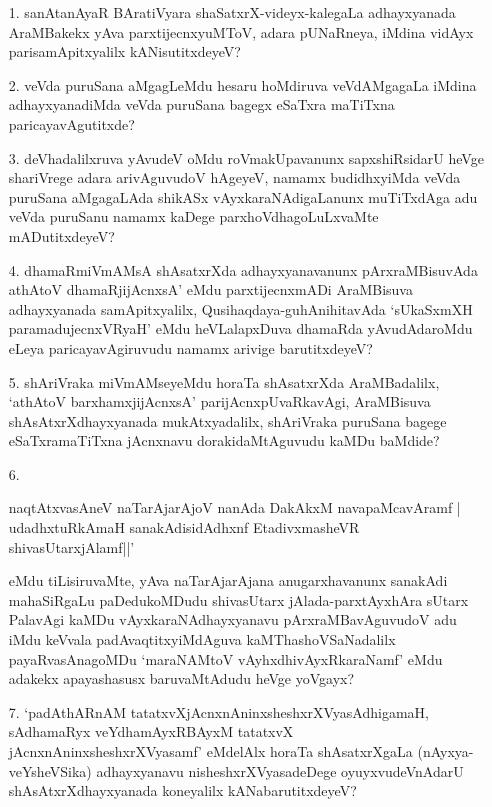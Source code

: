 \begin{itemize}
\item[1.] sanAtanAyaR BAratiVyara shaSatxrX-videyx-kalegaLa adhayxyanada AraMBakekx yAva parxtijecnxyuMToV, adara pUNaRneya, iMdina vidAyx parisamApitxyalilx kANisutitxdeyeV?

\item[2.] veVda puruSana aMgagLeMdu hesaru hoMdiruva veVdAMgagaLa iMdina adhayxyanadiMda veVda puruSana bagegx eSaTxra maTiTxna paricayavAgutitxde?

\item[3.] deVhadalilxruva yAvudeV oMdu roVmakUpavanunx sapxshiRsidarU heVge shariVrege adara arivAguvudoV hAgeyeV, namamx budidhxyiMda veVda puruSana aMgagaLAda shikASx vAyxkaraNAdigaLanunx muTiTxdAga adu veVda puruSanu namamx kaDege parxhoVdhagoLuLxvaMte mADutitxdeyeV?

\item[4.] dhamaRmiVmAMsA shAsatxrXda adhayxyanavanunx pArxraMBisuvAda 	athAtoV dhamaRjijAcnxsA'\label{40} eMdu parxtijecnxmADi AraMBisuva adhayxyanada samApitxyalilx, Qusihaqdaya-guhAnihitavAda `sUkaSxmXH paramadujecnxVRyaH'\label{40} eMdu heVLalapxDuva dhamaRda yAvudAdaroMdu eLeya paricayavAgiruvudu namamx arivige barutitxdeyeV?

\item[5.] shAriVraka miVmAMseyeMdu horaTa shAsatxrXda AraMBadalilx, `athAtoV barxhamxjijAcnxsA'\label{40} parijAcnxpUvaRkavAgi, AraMBisuva shAsAtxrXdhayxyanada mukAtxyadalilx, shAriVraka puruSana bagege eSaTxramaTiTxna jAcnxnavu dorakidaMtAguvudu kaMDu baMdide?

\item[6.]
\begin{shloka}
naqtAtxvasAneV naTarAjarAjoV nanAda DakAkxM navapaMcavAramf |\\\label{40}
udadhxtuRkAmaH sanakAdisidAdhxnf EtadivxmasheVR shivasUtarxjAlamf||'
\end{shloka}

eMdu tiLisiruvaMte, yAva naTarAjarAjana anugarxhavanunx sanakAdi mahaSiRgaLu paDedukoMDudu shivasUtarx jAlada-parxtAyxhAra sUtarx PalavAgi kaMDu vAyxkaraNAdhayxyanavu pArxraMBavAguvudoV adu iMdu keVvala padAvaqtitxyiMdAguva kaMThashoVSaNadalilx payaRvasAnagoMDu `maraNAMtoV vAyhxdhivAyxRkaraNamf'\label{41} eMdu adakekx apayashasusx baruvaMtAdudu heVge yoVgayx?

\item[7.] `padAthARnAM tatatxvXjAcnxnAninxsheshxrXVyasAdhigamaH,\label{41} sAdhamaRyx veYdhamAyxRBAyxM tatatxvX jAcnxnAninxsheshxrXVyasamf'\label{41} eMdelAlx horaTa shAsatxrXgaLa (nAyxya-veYsheVSika) adhayxyanavu nisheshxrXVyasadeDege oyuyxvudeVnAdarU shAsAtxrXdhayxyanada koneyalilx kANabarutitxdeyeV?
\end{itemize}

